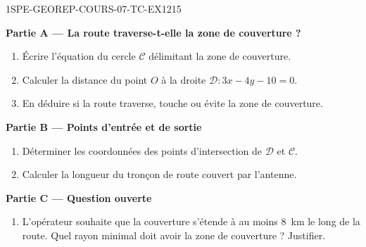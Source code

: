 \begin{exercice}{1SPE-GEOREP-COURS-07-TC-EX1}{2}{15}

\textbf{Partie A — La route traverse-t-elle la zone de couverture ?}

\begin{enumerate}
  \item Écrire l'équation du cercle $\mathcal{C}$ délimitant la zone de couverture.
  \item Calculer la distance du point $O$ à la droite $\mathcal{D} : 3x - 4y - 10 = 0$.
  \item En déduire si la route traverse, touche ou évite la zone de couverture.
\end{enumerate}

\textbf{Partie B — Points d'entrée et de sortie}

\begin{enumerate}[resume]
  \item Déterminer les coordonnées des points d'intersection de $\mathcal{D}$ et $\mathcal{C}$.
  \item Calculer la longueur du tronçon de route couvert par l'antenne.
\end{enumerate}

\textbf{Partie C — Question ouverte}

\begin{enumerate}[resume]
  \item L'opérateur souhaite que la couverture s'étende à au moins $8$~km le long de la route. Quel rayon minimal doit avoir la zone de couverture ? Justifier.
\end{enumerate}

\end{exercice}
